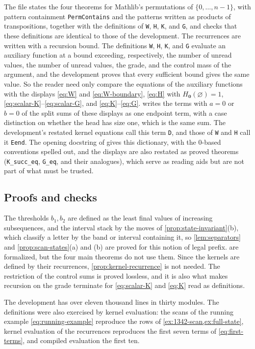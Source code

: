 \documentclass[11pt,reqno]{amsart}
\theoremstyle{definition}
\theoremstyle{remark}
\begin{document}
The file  states the four theorems for Mathlib's
permutations of $\{0,\ldots,n-1\}$, with pattern containment
\texttt{PermContains} and the patterns written as products of transpositions,
together with the definitions of \texttt{W}, \texttt{H}, \texttt{K}, and
\texttt{G}, and  checks that these definitions are identical
to those of the development.  The recurrences are written with a recursion
bound.  The definitions
\texttt{W}, \texttt{H}, \texttt{K}, and \texttt{G} evaluate an auxiliary
function at a bound exceeding, respectively, the number of unread values,
the number of unread values, the grade, and the control mass of the
argument, and the development
proves that every sufficient bound gives the same value.  So the reader need
only compare
the equations of the auxiliary functions with the displays \eqref{eq:W} and
\eqref{eq:W-boundary}, \eqref{eq:H} with $H_{\mathbf0}(\varnothing)=1$,
\eqref{eq:scalar-K}--\eqref{eq:scalar-G}, and \eqref{eq:K}--\eqref{eq:G}.
 writes the terms with $a=0$ or $b=0$ of the split sums
of these displays as one endpoint term, with a case distinction on whether
the head has size one, which is the same sum.  The development's restated
kernel equations call this term \texttt{D}, and those of \texttt{W} and
\texttt{H} call it \texttt{Eend}.  The opening docstring of
 gives this dictionary, with the $0$-based conventions
spelled out, and the displays are also restated as proved theorems
(\texttt{K\_succ\_eq}, \texttt{G\_eq}, and their analogues), which serve as
reading aids but are not part of what must be trusted.

\subsection{Proofs and checks}

The thresholds $b_1,b_2$ are defined as the least final values of
increasing subsequences, and the interval stack by the moves of
\cref{prop:state-invariant}(b), which classify a letter by the band or
interval containing it, so \cref{lem:separators} and
\cref{prop:scan-states}(a) and (b) are proved for this notion of legal
prefix.   are formalized, but the four
main theorems do not use them.  Since the kernels are defined by their
recurrences, \cref{prop:kernel-recurrence} is not needed.  The restriction of the
control sums is proved lossless, and it is also what makes recursion on
the grade terminate for \eqref{eq:scalar-K} and \eqref{eq:K} read as
definitions.

The development has over eleven thousand lines in thirty modules.  The
definitions were also
exercised by kernel evaluation: the scans of the running example
\eqref{eq:running-example} reproduce the rows of
\cref{ex:1342-scan,ex:full-state}, kernel evaluation of the recurrences
reproduces the first seven terms of \eqref{eq:first-terms}, and compiled
evaluation the first ten.



\end{document}
